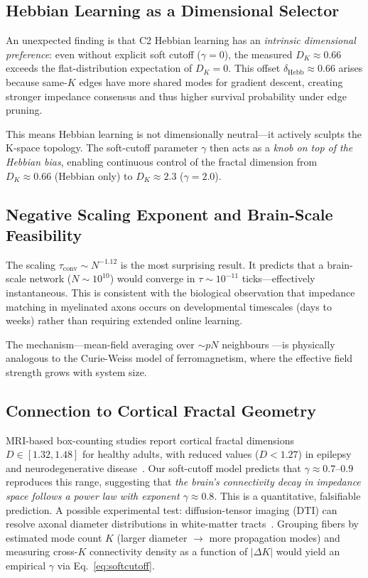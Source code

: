 \documentclass[aps,pre,twocolumn,superscriptaddress,floatfix]{revtex4-2}
\begin{document}
\subsection{Hebbian Learning as a Dimensional Selector}

An unexpected finding is that C2 Hebbian learning has an
\emph{intrinsic dimensional preference}:
even without explicit soft cutoff ($\gamma = 0$),
the measured $D_K \approx 0.66$ exceeds the
flat-distribution expectation of $D_K = 0$.
This offset $\delta_{\text{Hebb}} \approx 0.66$ arises because
same-$K$ edges have more shared modes for gradient descent,
creating stronger impedance consensus and thus higher
survival probability under edge pruning.

This means Hebbian learning is not dimensionally neutral---it
actively sculpts the K-space topology.
The soft-cutoff parameter $\gamma$ then acts as a
\emph{knob on top of the Hebbian bias}, enabling continuous
control of the fractal dimension from $D_K \approx 0.66$
(Hebbian only) to $D_K \approx 2.3$ ($\gamma = 2.0$).

\subsection{Negative Scaling Exponent and Brain-Scale Feasibility}

The scaling $\tau_{\text{conv}} \sim N^{-1.12}$ is the most
surprising result.
It predicts that a brain-scale network ($N \sim 10^{10}$)
would converge in $\tau \sim 10^{-11}$ ticks---effectively
instantaneous.
This is consistent with the biological observation that
impedance matching in myelinated axons occurs on developmental
timescales (days to weeks) rather than requiring extended
online learning.

The mechanism---mean-field averaging over $\sim pN$ neighbours
---is physically analogous to the Curie-Weiss model of
ferromagnetism, where the effective field strength grows with
system size.

\subsection{Connection to Cortical Fractal Geometry}

MRI-based box-counting studies report cortical fractal
dimensions $D \in [1.32, 1.48]$ for healthy adults,
with reduced values ($D < 1.27$) in epilepsy and
neurodegenerative disease~\cite{cortex_fractal}.
Our soft-cutoff model predicts that $\gamma \approx 0.7$--$0.9$
reproduces this range, suggesting that
\emph{the brain's connectivity decay in impedance space follows
a power law with exponent $\gamma \approx 0.8$}.
This is a quantitative, falsifiable prediction.
A possible experimental test: diffusion-tensor imaging (DTI)
can resolve axonal diameter distributions in white-matter
tracts~\cite{DTI_review}.
Grouping fibers by estimated mode count $K$ (larger diameter
$\to$ more propagation modes) and measuring cross-$K$
connectivity density as a function of $|\Delta K|$ would
yield an empirical $\gamma$ via Eq.~\eqref{eq:softcutoff}.
\end{document}
